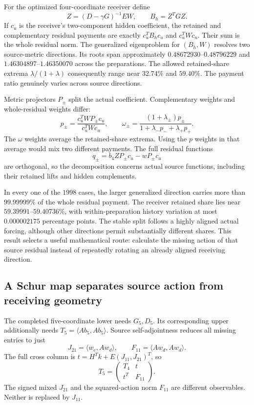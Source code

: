 For the optimized four-coordinate receiver define
\[
 Z=(D-\gamma G)^{-1}EW,\qquad B_h=Z^TGZ.
\]
If $c_u$ is the receiver's two-component hidden coefficient, the retained and complementary residual payments are exactly $c_u^TB_hc_u$ and $c_u^TWc_u$. Their sum is the whole residual norm. The generalized eigenproblem for $(B_h,W)$ resolves two source-metric directions. Its roots span approximately $0.48672930$--$0.48796229$ and $1.46304897$--$1.46350070$ across the preparations. The allowed retained-share extrema $\lambda/(1+\lambda)$ consequently range near $32.74\%$ and $59.40\%$. The payment ratio genuinely varies across source directions. 

Metric projectors $P_\pm$ split the actual coefficient. Complementary weights and whole-residual weights differ:
\[
 p_\pm=\frac{c_u^TWP_\pm c_u}{c_u^TWc_u},\qquad
 \omega_\pm=\frac{(1+\lambda_\pm)p_\pm}
                   {1+\lambda_-p_-+\lambda_+p_+}.
\]
The $\omega$ weights average the retained-share extrema. Using the $p$ weights in that average would mix two different payments. The full residual functions
\[
 q_\pm=b_4ZP_\pm c_u-wP_\pm c_u
\]
are orthogonal, so the decomposition concerns actual source functions, including their retained lifts and hidden complements.

In every one of the $1998$ cases, the larger generalized direction carries more than $99.99999\%$ of the whole residual payment. The receiver retained share lies near $59.39991$--$59.40736\%$, with within-preparation history variation at most $0.000002175$ percentage points. The stable split follows a highly aligned actual forcing, although other directions permit substantially different shares. This result selects a useful mathematical route: calculate the missing action of that source residual instead of repeatedly rotating an already aligned receiving direction.

\subsection{A Schur map separates source action from receiving geometry}

The completed five-coordinate lower needs $G_5,D_5$. Its corresponding upper additionally needs $T_5=\langle Ab_5,Ab_5\rangle$. Source self-adjointness reduces all missing entries to just
\[
 J_{21}=\langle w_e,Aw_d\rangle,\qquad
 F_{11}=\langle Aw_d,Aw_d\rangle.
\]
The full cross column is $t=H^Tk+E(J_{11},J_{21})^T$, so
\[
 T_5=\begin{pmatrix}T_4&t\\t^T&F_{11}\end{pmatrix}.
\]
The signed mixed $J_{21}$ and the squared-action norm $F_{11}$ are different observables. Neither is replaced by $J_{11}$. 

